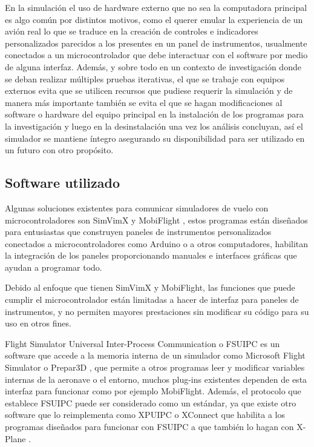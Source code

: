 En la simulación el uso de hardware externo que no sea la computadora principal es algo común por distintos motivos, como el querer emular la experiencia de un avión real lo que se traduce en la creación de controles e indicadores personalizados parecidos a los presentes en un panel de instrumentos, usualmente conectados a un microcontrolador que debe interactuar con el software por medio de alguna interfaz. Además, y sobre todo en un contexto de investigación donde se deban realizar múltiples pruebas iterativas, el que se trabaje con equipos externos evita que se utilicen recursos que pudiese requerir la simulación y de manera más importante también se evita el que se hagan modificaciones al software o hardware del equipo principal en la instalación de los programas para la investigación y luego en la desinstalación una vez los análisis concluyan, así el simulador se mantiene íntegro asegurando su disponibilidad para ser utilizado en un futuro con otro propósito.

\subsection{Software utilizado}

Algunas soluciones existentes para comunicar simuladores de vuelo con microcontroladores son SimVimX \cite{simvimx} y MobiFlight \cite{mobiflight}, estos programas están diseñados para entusiastas que construyen paneles de instrumentos personalizados conectados a microcontroladores como Arduino o a otros computadores, habilitan la integración de los paneles proporcionando manuales e interfaces gráficas que ayudan a programar todo. 

Debido al enfoque que tienen SimVimX y MobiFlight, las funciones que puede cumplir el microcontrolador están limitadas a hacer de interfaz para paneles de instrumentos, y no permiten mayores prestaciones sin modificar su código para su uso en otros fines.

Flight Simulator Universal Inter-Process Communication \cite{fsuipc} o FSUIPC es un software que accede a la memoria interna de un simulador como Microsoft Flight Simulator \cite{msfs} o Prepar3D \cite{prepar3d}, que permite a otros programas leer y modificar variables internas de la aeronave o el entorno, muchos plug-ins existentes dependen de esta interfaz para funcionar como por ejemplo MobiFlight. Además, el protocolo que establece FSUIPC puede ser considerado como un estándar, ya que existe otro software que lo reimplementa como XPUIPC \cite{xpuipc} o XConnect \cite{xc} que habilita a los programas diseñados para funcionar con FSUIPC a que también lo hagan con X-Plane \cite{xplane}.

